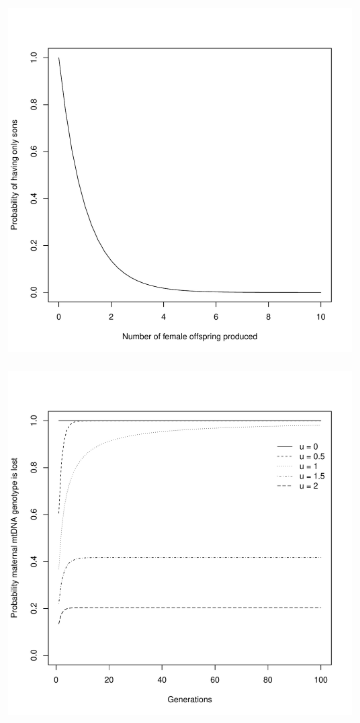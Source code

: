 \documentclass{report}\usepackage[]{graphicx}\usepackage[]{color}
\begin{document}
\begin{figure}[htb]
\centering
  \begin{subfigure}[b]{.5\linewidth}
    \centering
    \includegraphics[width=.99\textwidth]{images/listings-unnamed-chunk-11.pdf}
    \caption{}\label{fig:chunk-11}
  \end{subfigure}%
  \begin{subfigure}[b]{.5\linewidth}
    \centering
    \includegraphics[width=.99\textwidth]{images/listings-unnamed-chunk-12.pdf}

\end{subfigure}
\end{figure}
\end{document}
